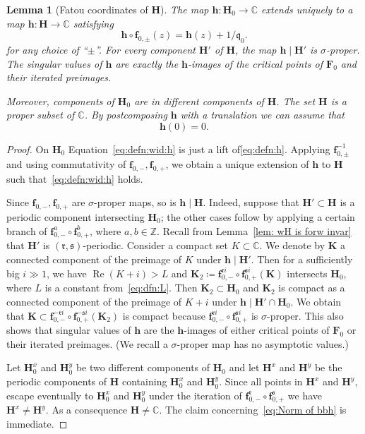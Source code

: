\documentclass[]{amsart}
\renewcommand{\Re}{\operatorname {Re}}
\newcommand{\bF}{{\mathbf F}}
\newcommand{\bH}{{\mathbf H}}
\newcommand{\bK}{{\mathbf K}}
\newcommand{\bbf}{{\mathbf f}}
\newcommand{\bbh}{{\mathbf h}}
\renewcommand{\qq}{\mathfrak{q}}
\newcommand{\rr}{\mathfrak{r}}
\renewcommand{\ss}{\mathfrak{s}}
\newcommand{\C}{\mathbb{C}}
\newcommand{\Z}{\mathbb{Z}}
\newtheorem{lem}[thm]{Lemma}
\theoremstyle{remark}
\numberwithin{equation}{section}
\theoremstyle{definition}
\begin{document}
\begin{lem}[Fatou coordinates of $ \bH$]
\label{lem:FatCoordPar}
The map $\bbh\colon  \bH_{0}\to \C$ extends uniquely to a  map $\bbh\colon \bH\to \C$ satisfying 
\begin{equation}
\label{eq:defn:wid:h}
\bbh\circ \bbf_{0,\pm}(z)= \bbh(z)+1/\qq_0.
\end{equation}
 for any choice of ``$\pm$''. For every component $\bH'$ of $ \bH$, the map $\bbh\mid \bH'$ is $\sigma$-proper. The singular values of $\bbh$ are exactly the $\bbh$-images of the critical points of $\bF_0$ and their iterated preimages. 
 
 Moreover, components of $\bH_0$ are in different components of $ \bH$. The set $\bH$ is a proper subset of $\C$. By postcomposing $\bbh$ with a translation we can assume that
 \begin{equation}
 \label{eq:Norm of bbh}
 \bbh(0)=0. 
 \end{equation}
\end{lem}
\begin{proof}
On $\bH_{0}$ Equation~\eqref{eq:defn:wid:h} is just a lift of\eqref{eq:defn:h}. Applying $\bbf_{0,\pm}^{-1}$ and using commutativity of $\bbf_{0,-},\bbf_{0,+}$, we obtain a unique extension of $\bbh$ to $\bH$ such that~\eqref{eq:defn:wid:h} holds.


Since $\bbf_{0,-},\bbf_{0,+}$ are $\sigma$-proper maps, so is $\bbh\mid \bH$. Indeed, suppose that $\bH'\subset  \bH$ is a periodic component intersecting $\bH_0$; the other cases follow by applying a certain branch of $\bbf^a_{0,-}\circ \bbf^b_{0,+}$, where $a,b\in\Z$. Recall from Lemma~\ref{lem: wH is forw invar} that  $\bH'$ is $(\rr,\ss)$-periodic. Consider a compact set $K\subset \C$. We denote by $\bK$ a connected component of the preimage of $K$ under $\bbh\mid \bH'$. Then for a sufficiently big 
$i\gg 1$, we have $\Re(K+ i)> L$ and $\bK_2\coloneqq  \bbf_{0,-}^{\rr i}\circ \bbf_{0,+}^{\ss i}( \bK)$ intersects $\bH_0$, where $L$ is a constant from~\eqref{eq:dfn:L}. Then $\bK_2\subset \bH_0$ and $\bK_2$ is compact as a connected component of the preimage of $K+ i$ under $\bbh\mid \bH' \cap  \bH_0$. We obtain that $\bK\subset \bbf_{0,-}^{-\rr i}\circ \bbf_{0,+}^{-\ss i}(\bK_2)$ is compact because $\bbf_{0,-}^{\rr i}\circ \bbf_{0,+}^{\ss i}$ is $\sigma$-proper. This also shows that singular values of  $\bbh$ are the $\bbh$-images of either critical points of $\bF_{0}$ or their iterated preimages. (We recall a $\sigma$-proper map has no asymptotic values.)

 
Let $\bH^x_0$ and $\bH^y_0$ be two different components of $\bH_0$ and let $\bH^x$ and $\bH^y$ be the periodic components of $\bH$ containing $\bH^x_0$ and $\bH^y_0$. Since all points in  $\bH^x$ and $\bH^y$, escape eventually to $\bH^x_0$ and $\bH^y_0$ under the iteration of $\bbf^\rr_{0,-}\circ \bbf_{0,+}^\ss$ we have  $\bH^x\not=\bH^y$. As a consequence $\bH\not=\C$. The claim concerning~\eqref{eq:Norm of bbh} is immediate. 
\end{proof}
\end{document}
